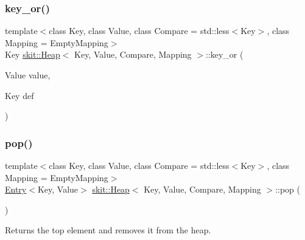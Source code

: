\mbox{\label{classskit_1_1Heap_acd46189f185f73307dea42c1af4257b9}} 
\subsubsection{\texorpdfstring{key\+\_\+or()}{key\_or()}}
{\footnotesize\ttfamily template$<$class Key, class Value, class Compare = std\+::less$<$\+Key$>$, class Mapping = Empty\+Mapping$>$ \\
Key \hyperlink{classskit_1_1Heap}{skit\+::\+Heap}$<$ Key, Value, Compare, Mapping $>$\+::key\+\_\+or (\begin{DoxyParamCaption}\item[{Value}]{value,  }\item[{Key}]{def }\end{DoxyParamCaption})\hspace{0.3cm}{\ttfamily [inline]}}

\mbox{\label{classskit_1_1Heap_adad991120658a69a49c69d5b9505df25}} 
\subsubsection{\texorpdfstring{pop()}{pop()}}
{\footnotesize\ttfamily template$<$class Key, class Value, class Compare = std\+::less$<$\+Key$>$, class Mapping = Empty\+Mapping$>$ \\
\hyperlink{structskit_1_1Entry}{Entry}$<$Key, Value$>$ \hyperlink{classskit_1_1Heap}{skit\+::\+Heap}$<$ Key, Value, Compare, Mapping $>$\+::pop (\begin{DoxyParamCaption}{ }\end{DoxyParamCaption})\hspace{0.3cm}{\ttfamily [inline]}}



Returns the top element and removes it from the heap. 

\mbox{\label{classskit_1_1Heap_a46c0cfa161ca8f50863747204d0a1372}} 
